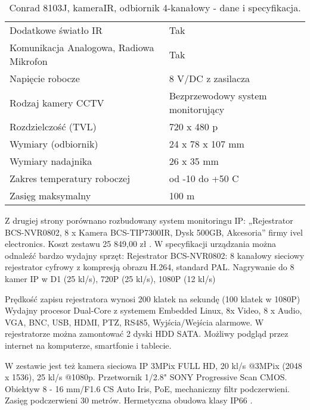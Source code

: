 \begin{table}[b!]
\caption[Conrad 8103J, kameraIR, odbiornik 4-kanałowy - dane i specyfikacja.]{Conrad 8103J, kameraIR, odbiornik 4-kanałowy - dane i specyfikacja.}
\begin{tabularx}{\textwidth}{|l|X|} 
 \hline
Dodatkowe światło IR & Tak \\ 
Komunikacja Analogowa, Radiowa Mikrofon &Tak \\
Napięcie robocze & 8 V/DC z zasilacza \\ 
Rodzaj kamery CCTV &  Bezprzewodowy system monitorujący \\
Rozdzielczość (TVL)& 720 x 480 p \\
Wymiary (odbiornik)& 24 x 78 x 107 mm \\  
Wymiary nadajnika & 26 x 35 mm \\ 
Zakres temperatury roboczej & od -10 do +50  C\\ 
Zasięg maksymalny & 100 m \\ \hline
\end{tabularx}  
\label{tab:compareAnalysers}
\end{table}

Z drugiej strony porównano rozbudowany system monitoringu IP: „Rejestrator BCS-NVR0802, 8 x Kamera BCS-TIP7300IR, Dysk 500GB, Akcesoria” firmy ivel electronics. Koszt zestawu 25 849,00 zł . W specyfikacji urządzania można odnaleźć bardzo wydajny sprzęt: 
Rejestrator BCS-NVR0802: 8 kanałowy sieciowy rejestrator cyfrowy z kompresją obrazu H.264, standard PAL. Nagrywanie do 8 kamer IP w D1 (25 kl/s), 720P (25 kl/s), 1080P (12 kl/s)



Prędkość zapisu rejestratora wynosi 200 klatek na sekundę (100 klatek w 1080P)
Wydajny procesor Dual-Core z systemem Embedded Linux, 8x Video, 8 x Audio, VGA, BNC, USB, HDMI, PTZ, RS485, Wyjścia/Wejścia alarmowe.
W rejestratorze można zamontować 2 dyski HDD SATA.
Możliwy podgląd przez internet na komputerze, smartfonie i tablecie. 

W zestawie jest też kamera sieciowa IP 3MPix FULL HD, 20 kl/s @3MPix (2048 x 1536), 25 kl/s @1080p. Przetwornik 1/2.8" SONY Progressive Scan CMOS. Obiektyw 8 - 16 mm/F1.6 CS Auto Iris, PoE, mechaniczny filtr podczerwieni. Zasięg podczerwieni 30 metrów. Hermetyczna  obudowa  klasy IP66 .

